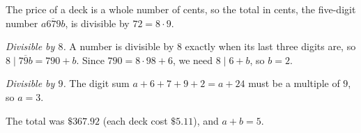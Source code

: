 The price of a deck is a whole number of cents, so the total in cents, the five-digit number $\overline{a679b}$, is divisible by $72=8\cdot9$.

\emph{Divisible by $8$.} A number is divisible by $8$ exactly when its last three digits are, so $8\mid\overline{79b}=790+b$. Since $790=8\cdot98+6$, we need $8\mid6+b$, so $b=2$.

\emph{Divisible by $9$.} The digit sum $a+6+7+9+2=a+24$ must be a multiple of $9$, so $a=3$.

The total was $\$367.92$ (each deck cost $\$5.11$), and $a+b=\boxed{5}$.

